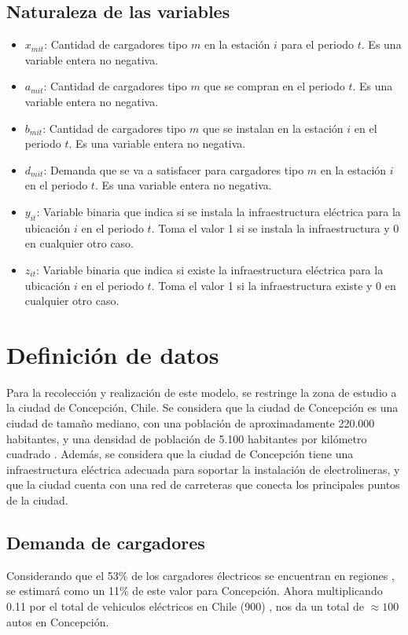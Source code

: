 \documentclass[letterpaper]{article}
\begin{document}
\begin{flushleft}
	\subsection{Naturaleza de las variables}
	\begin{itemize}
		\item $x_{mit}$: Cantidad de cargadores tipo $m$ en la estación $i$ para el periodo $t$. Es una variable entera no negativa.
		\item $a_{mit}$: Cantidad de cargadores tipo $m$ que se compran en el periodo $t$. Es una variable entera no negativa.
		\item $b_{mit}$: Cantidad de cargadores tipo $m$ que se instalan en la estación $i$ en el periodo $t$. Es una variable entera no negativa.
		\item $d_{mit}$: Demanda que se va a satisfacer para cargadores tipo $m$ en la estación $i$ en el periodo $t$. Es una variable entera no negativa.
		\item $y_{it}$: Variable binaria que indica si se instala la infraestructura eléctrica para la ubicación $i$ en el periodo $t$. Toma el valor 1 si se instala la infraestructura y 0 en cualquier otro caso.
		\item $z_{it}$: Variable binaria que indica si existe la infraestructura eléctrica para la ubicación $i$ en el periodo $t$. Toma el valor 1 si la infraestructura existe y 0 en cualquier otro caso.
	\end{itemize}
	\section{Definición de datos}

	Para la recolección y realización de este modelo, se restringe la zona de estudio a la ciudad de Concepción, Chile. Se considera que la ciudad de Concepción es una ciudad de tamaño mediano, con una población de aproximadamente 220.000 habitantes, y una densidad de población de 5.100 habitantes por kilómetro cuadrado \cite {INE}. Además, se considera que la ciudad de Concepción tiene una infraestructura eléctrica adecuada para soportar la instalación de electrolineras, y que la ciudad cuenta con una red de carreteras que conecta los principales puntos de la ciudad.

	\subsection{Demanda de cargadores}

	Considerando que el 53\% de los cargadores électricos se encuentran en regiones \cite{cargadores}, se estimará como un 11\% de este valor para Concepción. Ahora multiplicando 0.11 por el total de vehiculos eléctricos en Chile (900) \cite{autostot}, nos da un total de $\approx 100$ autos en Concepción.


\end{flushleft}
\end{document}
